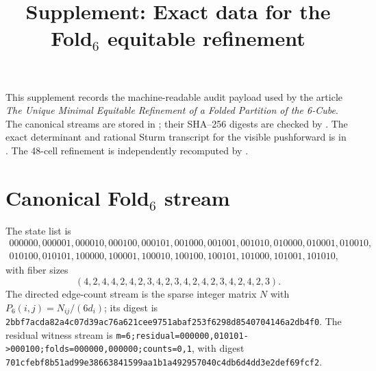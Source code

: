 \documentclass[11pt]{article}
\title{Supplement: Exact data for the Fold$_6$ equitable refinement}
\author{}
\date{}
\begin{document}
\maketitle

This supplement records the machine-readable audit payload used by the article
\emph{The Unique Minimal Equitable Refinement of a Folded Partition of the 6-Cube}.
The canonical streams are stored in ; their
SHA--256 digests are checked by .  The exact determinant
and rational Sturm transcript for the visible pushforward is in
.  The 48-cell refinement is
independently recomputed by .

\section*{Canonical Fold$_6$ stream}
The state list is
\[
\begin{gathered}
000000,000001,000010,000100,000101,001000,001001,001010,010000,010001,010010,\\
010100,010101,100000,100001,100010,100100,100101,101000,101001,101010,
\end{gathered}
\]
with fiber sizes
\[
(4,2,4,4,2,4,2,3,4,2,3,4,2,4,2,3,4,2,4,2,3).
\]
The directed edge-count stream is the sparse integer matrix \(N\) with
\(P_6(i,j)=N_{ij}/(6d_i)\); its digest is
\texttt{2bbf7acda82a4c07d39ac76a621cee9751abaf253f6298d8540704146a2db4f0}.
The residual witness stream is
\texttt{m=6;residual=000000,010101->000100;folds=000000,000000;counts=0,1},
with digest
\texttt{701cfebf8b51ad99e38663841599aa1b1a492957040c4db6d4dd3e2def69fcf2}.
\end{document}
